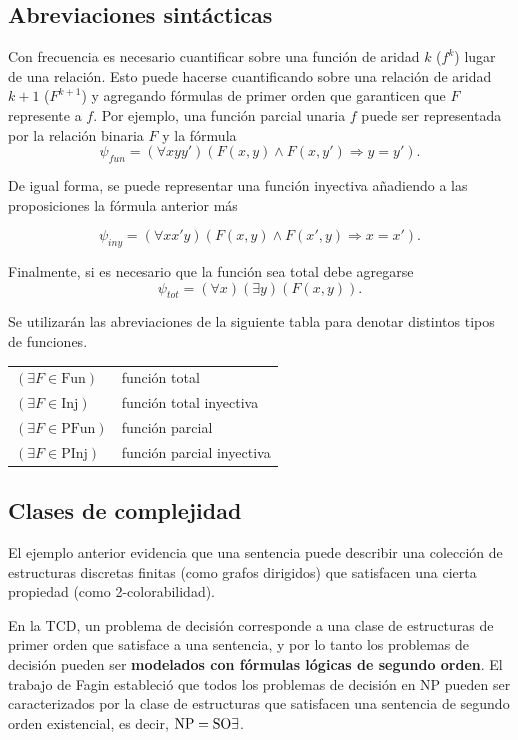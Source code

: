 \subsection{Abreviaciones sintácticas}
Con frecuencia es necesario cuantificar sobre una función de aridad $k$ ($f^k$)
lugar de una relación. Esto puede hacerse cuantificando sobre una relación de
aridad $k+1$ ($F^{k+1}$) y agregando fórmulas de primer orden que garanticen
que $F$ represente a $f$. Por ejemplo, una función parcial unaria $f$ puede ser
representada por la relación binaria $F$ y la fórmula
\[ \psi_{fun} = (\forall xyy')(F(x, y) \land F(x, y') \Rightarrow y = y'). \]

De igual forma, se puede representar una función inyectiva añadiendo a las
proposiciones la fórmula anterior más

\[ \psi_{iny} = (\forall xx'y)(F(x, y) \land F(x', y) \Rightarrow x = x'). \]

Finalmente, si es necesario que la función sea total debe agregarse
\[ \psi_{tot} = (\forall x)(\exists y)(F(x, y)). \]

Se utilizarán las abreviaciones de la siguiente tabla para denotar distintos
tipos de funciones.

\begin{tabular}{ll}
$(\exists F \in \text{Fun})$ & función total\\
$(\exists F \in \text{Inj})$ & función total inyectiva\\
$(\exists F \in \text{PFun})$ & función parcial\\
$(\exists F \in \text{PInj})$ & función parcial inyectiva\\
\end{tabular}

\subsection{Clases de complejidad}
El ejemplo anterior evidencia que una sentencia puede describir una colección
de estructuras discretas finitas (como grafos dirigidos) que satisfacen
una cierta propiedad (como 2-colorabilidad). 

En la TCD, un problema de decisión corresponde a una clase de estructuras de
primer orden que satisface a una sentencia, y por lo tanto los problemas de
decisión pueden ser \textbf{modelados con fórmulas lógicas de segundo orden}.
El trabajo de Fagin \cite{fagin:spectra} estableció que todos los problemas de
decisión en NP pueden ser caracterizados por la clase de estructuras que
satisfacen una sentencia de segundo orden existencial, es decir,
$\text{NP}=\text{SO}\exists$.

